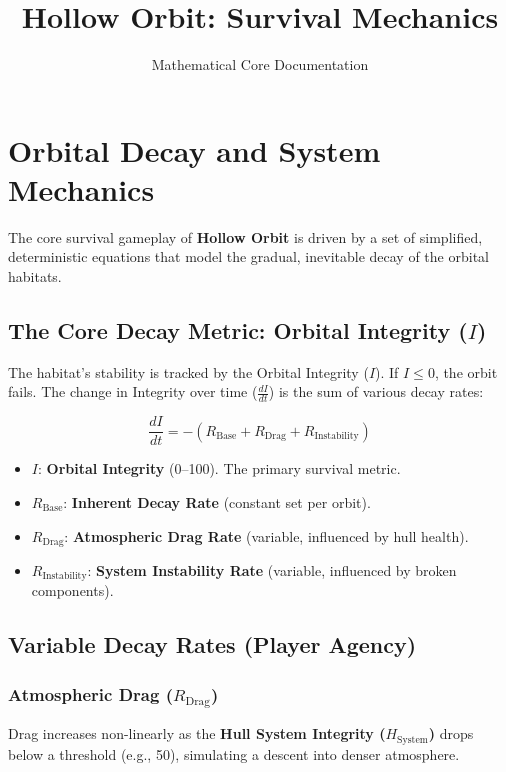 \documentclass{article}
\title{\color{DeepVoid}\textbf{Hollow Orbit: Survival Mechanics}}
\author{\large Mathematical Core Documentation}
\date{}
\newenvironment{mathbox}[1][\unskip]{
    \begin{tcolorbox}
    \textbf{#1}
}{
    \end{tcolorbox}
}
\begin{document}
\maketitle
\thispagestyle{empty} %

\section*{Orbital Decay and System Mechanics}

The core survival gameplay of \textbf{Hollow Orbit} is driven by a set of simplified, deterministic equations that model the gradual, inevitable decay of the orbital habitats.

\subsection{The Core Decay Metric: Orbital Integrity ($I$)}\hspace{0.5em}

The habitat's stability is tracked by the Orbital Integrity ($I$). If $I \le 0$, the orbit fails. The change in Integrity over time ($\frac{dI}{dt}$) is the sum of various decay rates:

\begin{mathbox}
$$
\frac{dI}{dt} = - (R_{\text{Base}} + R_{\text{Drag}} + R_{\text{Instability}})
$$
\end{mathbox}

\begin{itemize}
    \item $I$: \textbf{Orbital Integrity} (0--100). The primary survival metric.
    \item $R_{\text{Base}}$: \textbf{Inherent Decay Rate} (constant set per orbit).
    \item $R_{\text{Drag}}$: \textbf{Atmospheric Drag Rate} (variable, influenced by hull health).
    \item $R_{\text{Instability}}$: \textbf{System Instability Rate} (variable, influenced by broken components).
\end{itemize}

\vspace{1em}
\subsection{Variable Decay Rates (Player Agency)}\hspace{0.5em}

\subsubsection{Atmospheric Drag ($R_{\text{Drag}}$)}
Drag increases non-linearly as the \textbf{Hull System Integrity ($H_{\text{System}}$)} drops below a threshold (e.g., 50), simulating a descent into denser atmosphere.
\end{document}
